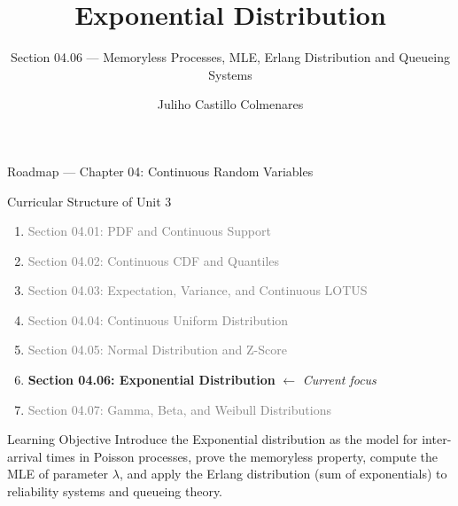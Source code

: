 \documentclass[aspectratio=169,xcolor={dvipsnames,table}]{beamer}
\title{Exponential Distribution}
\subtitle{Section 04.06 --- Memoryless Processes, MLE, Erlang Distribution and Queueing Systems}
\author[J. Castillo Colmenares]{Juliho Castillo Colmenares}
\institute[Tec de Monterrey]{Tecnologico de Monterrey}
\date{\vspace{-1.5cm}}
\begin{document}
\begin{frame}[plain]
	\titlepage
\end{frame}

\begin{frame}{Roadmap --- Chapter 04: Continuous Random Variables}
	\vspace{-0.15cm}
	\begin{block}{Curricular Structure of Unit 3}
		\footnotesize
		\begin{enumerate}\itemsep=0.03cm
			\item \textcolor{gray}{Section 04.01: PDF and Continuous Support}
			\item \textcolor{gray}{Section 04.02: Continuous CDF and Quantiles}
			\item \textcolor{gray}{Section 04.03: Expectation, Variance, and Continuous LOTUS}
			\item \textcolor{gray}{Section 04.04: Continuous Uniform Distribution}
			\item \textcolor{gray}{Section 04.05: Normal Distribution and Z-Score}
			\item \textbf{\textcolor{TecRojo}{Section 04.06: Exponential Distribution}} $\leftarrow$ \emph{Current focus}
			\item \textcolor{gray}{Section 04.07: Gamma, Beta, and Weibull Distributions}
		\end{enumerate}
	\end{block}
	\vspace{-0.2cm}
	\begin{alertblock}{Learning Objective}
		\scriptsize
		Introduce the Exponential distribution as the model for inter-arrival times in Poisson processes, prove the memoryless property, compute the MLE of parameter $\lambda$, and apply the Erlang distribution (sum of exponentials) to reliability systems and queueing theory.
	\end{alertblock}
\end{frame}
\end{document}

